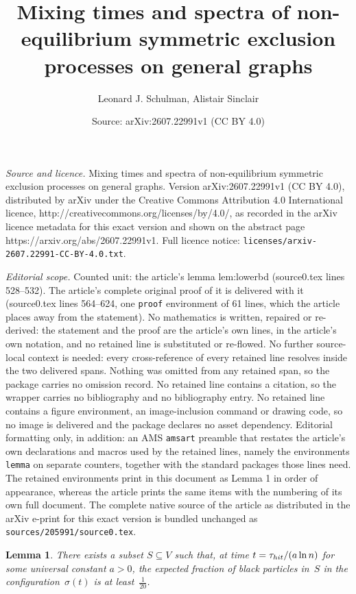 \documentclass[10pt,a4paper]{amsart}
\title{Mixing times and spectra of non-equilibrium symmetric exclusion processes on general graphs}
\author{Leonard J. Schulman, Alistair Sinclair}
\date{Source: arXiv:2607.22991v1 (CC BY 4.0)}
\newtheorem{lemma}{Lemma}
\newcommand{\hit}{\tau_{\rm hit}}
\begin{document}
\maketitle

\noindent\emph{Source and licence.} Mixing times and spectra of non-equilibrium symmetric exclusion processes on general graphs. Version arXiv:2607.22991v1 (CC BY 4.0), distributed by arXiv under the Creative Commons Attribution 4.0 International licence, http://creativecommons.org/licenses/by/4.0/, as recorded in the arXiv licence metadata for this exact version and shown on the abstract page https://arxiv.org/abs/2607.22991v1. Full licence notice: \texttt{licenses/arxiv-2607.22991-CC-BY-4.0.txt}.\par\smallskip

\noindent\textit{Editorial scope.} Counted unit: the article's lemma lem:lowerbd (source0.tex lines 528--532). The article's complete original proof of it is delivered with it (source0.tex lines 564--624, one \texttt{proof} environment of 61 lines, which the article places away from the statement). No mathematics is written, repaired or re-derived: the statement and the proof are the article's own lines, in the article's own notation, and no retained line is substituted or re-flowed.  No further source-local context is needed: every cross-reference of every retained line resolves inside the two delivered spans.  Nothing was omitted from any retained span, so the package carries no omission record.  No retained line contains a citation, so the wrapper carries no bibliography and no bibliography entry.  No retained line contains a figure environment, an image-inclusion command or drawing code, so no image is delivered and the package declares no asset dependency.  Editorial formatting only, in addition: an AMS \texttt{amsart} preamble that restates the article's own declarations and macros used by the retained lines, namely the environments \texttt{lemma} on separate counters, together with the standard packages those lines need.  The retained environments print in this document as Lemma 1 in order of appearance, whereas the article prints the same items with the numbering of its own full document.  The complete native source of the article as distributed in the arXiv e-print for this exact version is bundled unchanged as \texttt{sources/205991/source0.tex}.
\begin{lemma}\label{lem:lowerbd}
There exists a subset $S\subseteq V$ such that, at time
$t=\hit/(a\ln n)$ for some universal constant $a>0$, the expected fraction of black particles in~$S$ in the
configuration~$\sigma(t)$ is at least~$\frac{1}{20}$.
\end{lemma}
\end{document}
